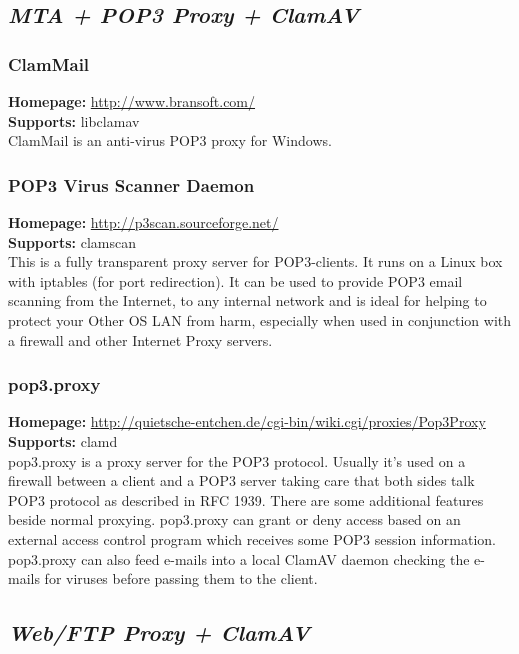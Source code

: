 \documentclass[a4paper,titlepage,12pt]{article}
\begin{document}
    \subsection{\emph{MTA + POP3 Proxy + ClamAV}}

    \subsubsection{ClamMail}
    \textbf{Homepage:} \url{http://www.bransoft.com/}\\
    \textbf{Supports:} libclamav\\[4pt]
    ClamMail is an anti-virus POP3 proxy for Windows.

    \subsubsection{POP3 Virus Scanner Daemon}
    \textbf{Homepage:} \url{http://p3scan.sourceforge.net/}\\
    \textbf{Supports:} clamscan\\[4pt]
    This is a fully transparent proxy server for POP3-clients. It runs on
    a Linux box with iptables (for port redirection). It can be used to
    provide POP3 email scanning from the Internet, to any internal network
    and is ideal for helping to protect your Other OS LAN from harm,
    especially when used in conjunction with a firewall and other Internet
    Proxy servers.

    \subsubsection{pop3.proxy}
    \textbf{Homepage:} \url{http://quietsche-entchen.de/cgi-bin/wiki.cgi/proxies/Pop3Proxy}\\
    \textbf{Supports:} clamd\\[4pt]
     pop3.proxy is a proxy server for the POP3 protocol. Usually it's used on
     a firewall between a client and a POP3 server taking care that both sides
     talk POP3 protocol as described in RFC 1939. There are some additional
     features beside normal proxying. pop3.proxy can grant or deny access
     based on an external access control program which receives some POP3
     session information. pop3.proxy can also feed e-mails into a local
     ClamAV daemon checking the e-mails for viruses before passing them to
     the client. 

    \subsection{\emph{Web/FTP Proxy + ClamAV}}
\end{document}

